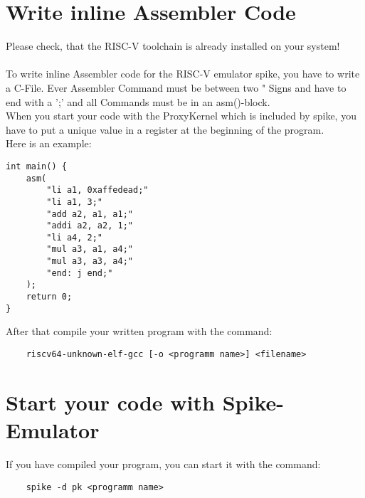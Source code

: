 \documentclass[a4paper, oneside]{scrreprt}
\author{Andre Brand}
\begin{document}
\chapter{Write inline Assembler Code}

Please check, that the RISC-V toolchain is already installed on your system!\\
\\
To write inline Assembler code for the RISC-V emulator spike, you have to write a C-File. Ever Assembler Command must be between two " Signs and have to end with a ';' and all Commands must be in an asm()-block.\\
When you start your code with the ProxyKernel which is included by spike, you have to put a unique value in a register at the beginning of the program.\\
Here is an example:\\
\begin{verbatim}
int main() {
    asm(
        "li a1, 0xaffedead;"
        "li a1, 3;"
        "add a2, a1, a1;"
        "addi a2, a2, 1;"
        "li a4, 2;"
        "mul a3, a1, a4;"
        "mul a3, a3, a4;"
        "end: j end;"
    );
    return 0;
}
\end{verbatim}

After that compile your written program with the command:
\begin{verbatim}
    riscv64-unknown-elf-gcc [-o <programm name>] <filename>
\end{verbatim}

\chapter{Start your code with Spike-Emulator}

If you have compiled your program, you can start it with the command:
\begin{verbatim}
    spike -d pk <programm name>
\end{verbatim}
\end{document}
